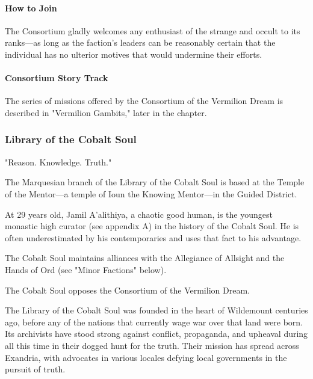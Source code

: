 \documentclass[10pt,a4paper,twoside,bg=print,twocolumn,openany,nodeprecatedcode]{dndbook}
\begin{document}
\paragraph{How to Join}
The Consortium gladly welcomes any enthusiast of the strange and occult to its ranks—as long as the faction's leaders can be reasonably certain that the individual has no ulterior motives that would undermine their efforts.

\paragraph{Consortium Story Track}
The series of missions offered by the Consortium of the Vermilion Dream is described in "Vermilion Gambits," later in the chapter.


\subsubsection{Library of the Cobalt Soul}
"Reason. Knowledge. Truth."


\begin{description}[nolistsep]
\item[Headquarters.]
The Marquesian branch of the Library of the Cobalt Soul is based at the Temple of the Mentor—a temple of Ioun the Knowing Mentor—in the Guided District.
\end{description}

\begin{description}[nolistsep]
\item[Leader.]
At 29 years old, Jamil A'alithiya, a chaotic good human, is the youngest monastic high curator (see appendix A) in the history of the Cobalt Soul. He is often underestimated by his contemporaries and uses that fact to his advantage.
\item[Allies.]
The Cobalt Soul maintains alliances with the Allegiance of Allsight and the Hands of Ord (see "Minor Factions" below).
\item[Opponents.]
The Cobalt Soul opposes the Consortium of the Vermilion Dream.
\end{description}

The Library of the Cobalt Soul was founded in the heart of Wildemount centuries ago, before any of the nations that currently wage war over that land were born. Its archivists have stood strong against conflict, propaganda, and upheaval during all this time in their dogged hunt for the truth. Their mission has spread across Exandria, with advocates in various locales defying local governments in the pursuit of truth.
\end{document}
